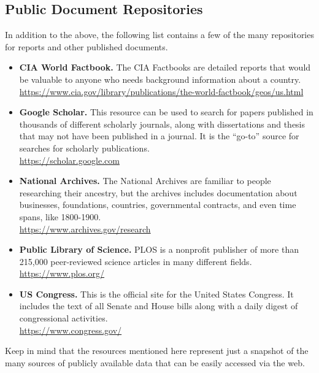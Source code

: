 \subsection{Public Document Repositories}

In addition to the above, the following list contains a few of the many repositories for reports and other published documents. 

\begin{itemize}

	\item \textbf{CIA World Factbook.} The CIA Factbooks are detailed reports that would be valuable to anyone who needs background information about a country. 
	\\ \url{https://www.cia.gov/library/publications/the-world-factbook/geos/us.html}

	\item \textbf{Google Scholar.} This resource can be used to search for papers published in thousands of different scholarly journals, along with dissertations and thesis that may not have been published in a journal. It is the ``go-to'' source for searches for scholarly publications.  
	\\ \url{https://scholar.google.com}

	\item \textbf{National Archives.} The National Archives are familiar to people researching their ancestry, but the archives includes documentation about businesses, foundations, countries, governmental contracts, and even time spans, like 1800-1900. 
	\\ \url{https://www.archives.gov/research}

	\item \textbf{Public Library of Science.} PLOS is a nonprofit publisher of more than 215,000 peer-reviewed science articles in many different fields.
	\\ \url{https://www.plos.org/}

	\item \textbf{US Congress.} This is the official site for the United States Congress. It includes the text of all Senate and House bills along with a daily digest of congressional activities.
	\\ \url{https://www.congress.gov/}

\end{itemize}

Keep in mind that the resources mentioned here represent just a snapshot of the many sources of publicly available data that can be easily accessed via the web. 

